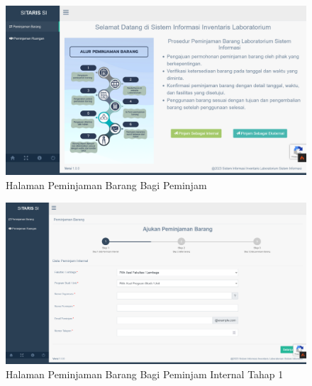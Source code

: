 \begin{enumerate}

        \begin{figure}
          \centering
          \includegraphics[width=0.82\linewidth]{konten//gambar/peminjaman barang pinjam hasil.png}
          \caption{Halaman Peminjaman Barang Bagi Peminjam}
          \label{fig:enter-label}
        \end{figure}

        \begin{figure}
          \centering
          \includegraphics[width=0.82\linewidth]{konten//gambar/peminjaman barang tambah internal 1 hasil.png}
          \caption{Halaman Peminjaman Barang Bagi Peminjam Internal Tahap 1}
          \label{fig:enter-label}
        \end{figure}


\end{enumerate}
